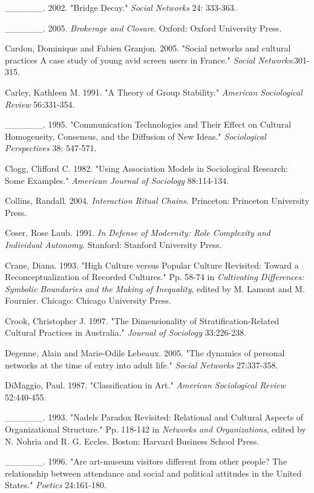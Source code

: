 \documentclass[
]{article}
\begin{document}
\_\_\_\_\_\_. 2002. "Bridge Decay." \emph{Social Networks} 24: 333-363.

\_\_\_\_\_\_. 2005. \emph{Brokerage and Closure}. Oxford: Oxford University Press.

Cardon, Dominique and Fabien Granjon. 2005. "Social networks and cultural practices A case study of young avid screen users in France." \emph{Social Networks}:301-315.

Carley, Kathleen M. 1991. "A Theory of Group Stability." \emph{American Sociological Review} 56:331-354.

\_\_\_\_\_\_. 1995. "Communication Technologies and Their Effect on Cultural Homogeneity, Consensus, and the Diffusion of New Ideas." \emph{Sociological Perspectives} 38: 547-571.

Clogg, Clifford C. 1982. "Using Association Models in Sociological Research: Some Examples." \emph{American Journal of Sociology} 88:114-134.

Collins, Randall. 2004. \emph{Interaction Ritual Chains}. Princeton: Princeton University Press.

Coser, Rose Laub. 1991. \emph{In Defense of Modernity: Role Complexity and Individual Autonomy}. Stanford: Stanford University Press.

Crane, Diana. 1993. "High Culture versus Popular Culture Revisited: Toward a Reconceptualization of Recorded Cultures." Pp. 58-74 in \emph{Cultivating Differences: Symbolic Boundaries and the Making of Inequality}, edited by M. Lamont and M. Fournier. Chicago: Chicago University Press.

Crook, Christopher J. 1997. "The Dimensionality of Stratification-Related Cultural Practices in Australia." \emph{Journal of Sociology} 33:226-238.

Degenne, Alain and Marie-Odile Lebeaux. 2005. "The dynamics of personal networks at the time of entry into adult life." \emph{Social Networks} 27:337-358.

DiMaggio, Paul. 1987. "Classification in Art." \emph{American Sociological Review} 52:440-455.

\_\_\_\_\_\_. 1993. "Nadel\textquotesingle s Paradox Revisited: Relational and Cultural Aspects of Organizational Structure." Pp. 118-142 in \emph{Networks and Organizations}, edited by N. Nohria and R. G. Eccles. Boston: Harvard Business School Press.

\_\_\_\_\_\_. 1996. "Are art-museum visitors different from other people? The relationship between attendance and social and political attitudes in the United States." \emph{Poetics} 24:161-180.
\end{document}
